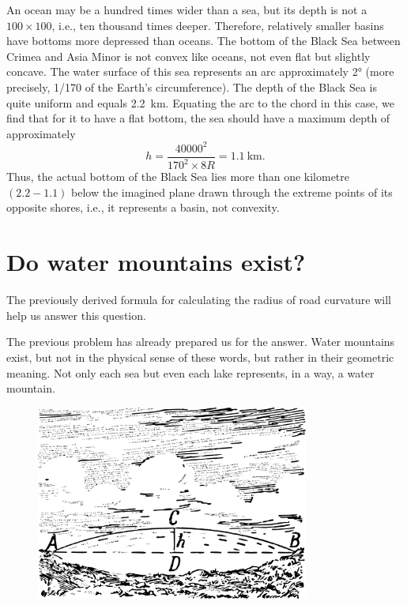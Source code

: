 An ocean may be a hundred times wider than a sea, but its depth is not a $100 \times 100$, i.e., ten thousand times deeper. Therefore, relatively smaller basins have bottoms more depressed than oceans. The bottom of the Black Sea between Crimea and Asia Minor is not convex like oceans, not even flat but slightly concave. The water surface of this sea represents an arc approximately \ang{2} (more precisely, 1/170 of the Earth's circumference). The depth of the Black Sea is quite uniform and equals \SI{2.2}{\kilo\meter}. Equating the arc to the chord in this case, we find that for it to have a flat bottom, the sea should have a maximum depth of approximately 
\begin{equation*}%
h = \frac{40000^{2}}{ 170^{2} \times 8R} = \SI{1.1}{\kilo\meter}.
\end{equation*}
Thus, the actual bottom of the Black Sea lies more than one kilometre $(2.2 - 1.1)$ below the imagined plane drawn through the extreme points of its opposite shores, i.e., it represents a basin, not convexity.

\clearpage

\section{Do water mountains exist?}
\label{sec-4.9}


The previously derived formula for calculating the radius of road curvature will help us answer this question.

The previous problem has already prepared us for the answer. Water mountains exist, but not in the physical sense of these words, but rather in their geometric meaning. Not only each sea but even each lake represents, in a way, a water mountain. 

\begin{figure}[h!]
\centering
\includegraphics[width=0.8\textwidth]{figures/ch-04/fig-087.pdf}
\end{figure}

